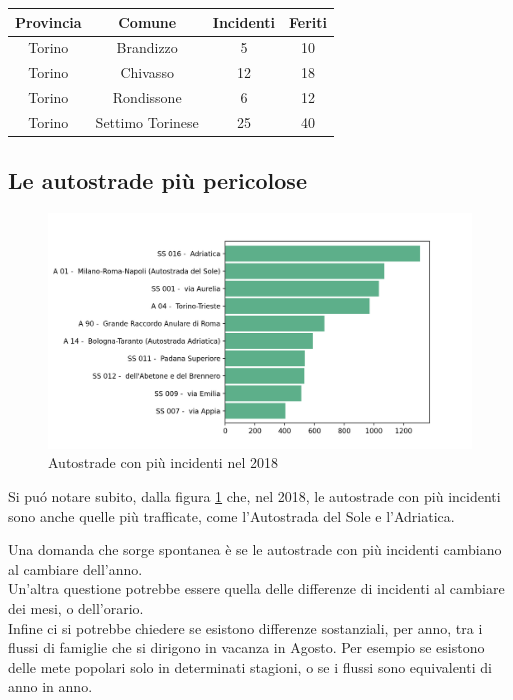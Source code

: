 \documentclass[a4paper]{report}
\begin{document}
\begin{center}
    \def\arraystretch{1.5}%
    \begin{tabular}{ |c|c|c|c| } 
    \hline
    Provincia & Comune & Incidenti & Feriti \\ 
    \hline
    \rowcolor{TableGray}
    Torino & Brandizzo & 5 & 10\\
    Torino & Chivasso & 12 & 18\\
    \rowcolor{TableGray}
    Torino & Rondissone & 6 & 12\\
    Torino & Settimo Torinese & 25 & 40\\
    \hline
    \end{tabular}
\end{center}

\subsection{Le autostrade più pericolose}
\begin{figure}
    \includegraphics[width=\linewidth]{../src/incidenti/incidenti_aci/autostrade/autostrade.png}
    \caption{Autostrade con più incidenti nel 2018}
    \label{fig:incidenti-autostrade}
\end{figure}

Si pu\'o notare subito, dalla figura \ref{fig:incidenti-autostrade} che, nel 2018, le autostrade con 
più incidenti sono anche quelle più trafficate, come l'Autostrada del Sole e l'Adriatica.

Una domanda che sorge spontanea è se le autostrade con più incidenti cambiano al cambiare dell'anno.\\
Un'altra questione potrebbe essere quella delle differenze di incidenti al cambiare dei mesi, 
o dell'orario.\\
Infine ci si potrebbe chiedere se esistono differenze sostanziali, per anno, tra i flussi di 
famiglie che si dirigono in vacanza in Agosto. Per esempio se esistono delle mete 
popolari solo in determinati stagioni, o se i flussi sono equivalenti di anno in anno.
\end{document}
